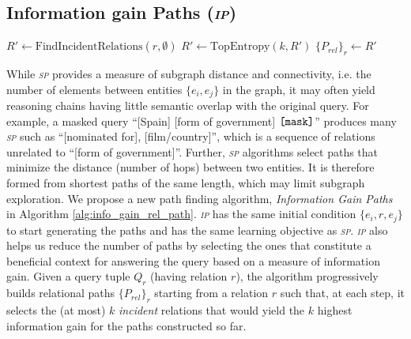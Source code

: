 \documentclass{article}
\newcommand{\spa}{\textsl{\textsc{sp}}\xspace}
\newcommand{\ipa}{\textsl{\textsc{ip}}\xspace}
\newcommand{\mask}{\mbox{\texttt{[mask]}}}
\begin{document}
\subsection{Information gain Paths (\ipa)}
\label{sec:info_path}

\begin{algorithm}
\small
\caption{\small Top\_k Path Information Gain}
    \SetAlgoLined
    \DontPrintSemicolon
    \label{alg:info_gain_rel_path}  %
    \SetCustomAlgoRuledWidth{1.2cm}  %

    \(R' \gets \text{FindIncidentRelations}(r, \emptyset)\) 
    \(R' \gets \text{TopEntropy}(k, R')\) 
    \(\{P_{rel}\}_r \gets R'\) \;
\end{algorithm}


While \spa provides a measure of subgraph distance and connectivity, i.e. the number of elements between entities $\{e_i,e_j\}$ in the graph, it may often yield reasoning chains having little semantic overlap with the original query. 
For example, a masked query ``[Spain] [form of government] $\mask{}$'' produces many \spa such as ``[nominated for], [film/country]'', which is a sequence of relations unrelated to ``[form of government]''.
Further, \spa algorithms select paths that minimize the distance (number of hops) between two entities. 
It is therefore formed from shortest paths of the same length, which may limit subgraph exploration.
We propose a new path finding algorithm, \emph{Information Gain Paths} in Algorithm \ref{alg:info_gain_rel_path}. 
\ipa has the same initial condition $\{e_i, r, e_j\}$ to start generating the paths and has the same learning objective as \spa.
\ipa also helps us reduce the number of paths by selecting the ones that constitute a beneficial context for answering the query based on a measure of information gain. 
Given a query tuple $Q_r$ (having relation $r$), the algorithm progressively builds relational paths $\{P_{rel}\}_{r}$ starting from a relation $r$ such that, at each step, it selects the (at most) $k$ \emph{incident} relations that would yield the $k$ highest information gain for the paths constructed so far.
\end{document}
